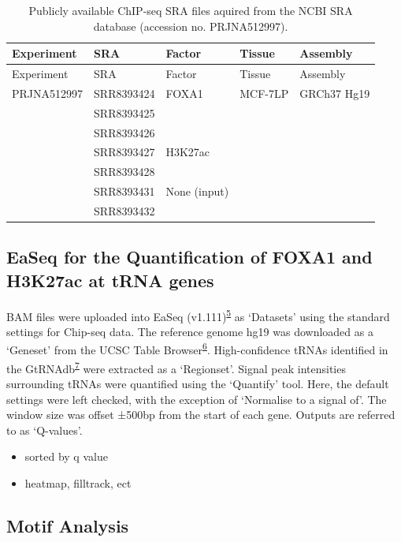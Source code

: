\documentclass[
  11pt,
]{article}
\begin{document}
\begin{longtable}[]{@{}lllll@{}}
\caption{\label{tab:data}Publicly available ChIP-seq SRA files aquired from the NCBI SRA database (accession no. PRJNA512997).}\tabularnewline
\toprule()
Experiment & SRA & Factor & Tissue & Assembly \\
\midrule()
\endfirsthead
\toprule()
Experiment & SRA & Factor & Tissue & Assembly \\
\midrule()
\endhead
PRJNA512997 & SRR8393424 & FOXA1 & MCF-7LP & GRCh37 Hg19 \\
& SRR8393425 & & & \\
& SRR8393426 & & & \\
& SRR8393427 & H3K27ac & & \\
& SRR8393428 & & & \\
& SRR8393431 & None (input) & & \\
& SRR8393432 & & & \\
\bottomrule()
\end{longtable}

\hypertarget{easeq-for-the-quantification-of-foxa1-and-h3k27ac-at-trna-genes}{%
\subsection{EaSeq for the Quantification of FOXA1 and H3K27ac at tRNA genes}\label{easeq-for-the-quantification-of-foxa1-and-h3k27ac-at-trna-genes}}

BAM files were uploaded into EaSeq (v1.111)\textsuperscript{\protect\hyperlink{ref-lerdrup2016}{5}} as `Datasets' using the standard settings for Chip-seq data.
The reference genome hg19 was downloaded as a `Geneset' from the UCSC Table Browser\textsuperscript{\protect\hyperlink{ref-Karolchik2004}{6}}.
High-confidence tRNAs identified in the GtRNAdb\textsuperscript{\protect\hyperlink{ref-Chan2016}{7}} were extracted as a `Regionset'.
Signal peak intensities surrounding tRNAs were quantified using the `Quantify' tool.
Here, the default settings were left checked, with the exception of `Normalise to a signal of'.
The window size was offset ±500bp from the start of each gene.
Outputs are referred to as `Q-values'.

\begin{itemize}
\item
  sorted by q value
\item
  heatmap, filltrack, ect
\end{itemize}

\hypertarget{motif-analysis}{%
\subsection{Motif Analysis}\label{motif-analysis}}
\end{document}
